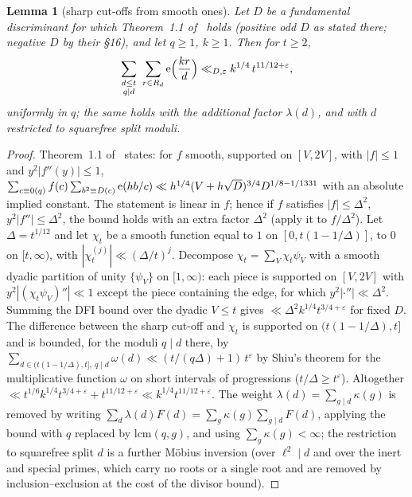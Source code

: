 \documentclass[11pt,a4paper]{article}
\newtheorem{lemma}[theorem]{Lemma}
\theoremstyle{remark}\newtheorem{remark}[theorem]{Remark}
\begin{document}
\begin{lemma}[sharp cut-offs from smooth ones]\label{lem:sharp}
Let $D$ be a fundamental discriminant for which Theorem~1.1 of~\cite{DFI2012} holds (positive odd $D$ as
stated there; negative $D$ by their \S16), and let $q\ge1$, $k\ge1$. Then for $t\ge2$,
\[
\sum_{\substack{d\le t\\ q\mid d}}\ \sum_{r\in R_d}\e\Bigl(\frac{kr}d\Bigr)\ll_{D,\varepsilon}k^{1/4}\,t^{11/12+\varepsilon},
\]
uniformly in $q$; the same holds with the additional factor $\lambda(d)$, and with $d$ restricted to squarefree split
moduli.
\end{lemma}
\begin{proof}
Theorem~1.1 of~\cite{DFI2012} states: for $f$ smooth, supported on $[V,2V]$, with $|f|\le1$ and $y^2|f''(y)|\le1$,
$\sum_{c\equiv0(q)}f(c)\sum_{b^2\equiv D(c)}\mathrm{e}(hb/c)\ll h^{1/4}(V+h\sqrt D)^{3/4}D^{1/8-1/1331}$ with an absolute
implied constant. The statement is linear in $f$; hence if $f$ satisfies $|f|\le\Delta^2$, $y^2|f''|\le\Delta^2$, the
bound holds with an extra factor $\Delta^2$ (apply it to $f/\Delta^2$). Let $\Delta=t^{1/12}$ and let $\chi_t$ be a smooth
function equal to $1$ on $[0,t(1-1/\Delta)]$, to $0$ on $[t,\infty)$, with $|\chi_t^{(j)}|\ll(\Delta/t)^j$. Decompose
$\chi_t=\sum_V\chi_t\psi_V$ with a smooth dyadic partition of unity $\{\psi_V\}$ on $[1,\infty)$: each piece is supported
on $[V,2V]$ with $y^2|(\chi_t\psi_V)''|\ll1$ except the piece containing the edge, for which $y^2|\cdot''|\ll\Delta^2$.
Summing the DFI bound over the dyadic $V\le t$ gives $\ll\Delta^2k^{1/4}t^{3/4+\varepsilon}$ for fixed $D$. The difference
between the sharp cut-off and $\chi_t$ is supported on $(t(1-1/\Delta),t]$ and is bounded, for the moduli $q\mid d$
there, by $\sum_{d\in(t(1-1/\Delta),t],\ q\mid d}\omega(d)\ll(t/(q\Delta)+1)\,t^{\varepsilon}$ by Shiu's theorem for the
multiplicative function $\omega$ on short intervals of progressions ($t/\Delta\ge t^{\varepsilon}$). Altogether
$\ll t^{1/6}k^{1/4}t^{3/4+\varepsilon}+t^{11/12+\varepsilon}\ll k^{1/4}t^{11/12+\varepsilon}$. The weight $\lambda(d)=\sum_{g\mid d}\kappa(g)$
is removed by writing $\sum_d\lambda(d)F(d)=\sum_g\kappa(g)\sum_{g\mid d}F(d)$, applying the bound with $q$ replaced by
$\mathrm{lcm}(q,g)$, and using $\sum_g\kappa(g)<\infty$; the restriction to squarefree split $d$ is a further M\"obius
inversion (over $\ell^2\mid d$ and over the inert and special primes, which carry no roots or a single root and
are removed by inclusion--exclusion at the cost of the divisor bound).
\end{proof}
\end{document}

